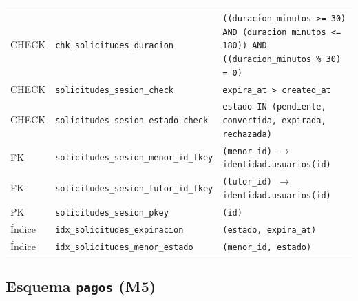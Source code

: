 {\small
\begin{xltabular}{\textwidth}{@{}>{\raggedright\arraybackslash}p{1.7cm} >{\raggedright\arraybackslash}p{4.6cm} L@{}}
    \toprule
     &  &  \\
    \midrule
    \endfirsthead
    \toprule
     &  &  \\
    \midrule
    \endhead
    \bottomrule
    \endfoot
    CHECK & \texttt{chk\_\allowbreak{}solicitudes\_\allowbreak{}duracion} & \texttt{(\allowbreak{}(\allowbreak{}duracion\_\allowbreak{}minutos \textgreater{}= 30) AND (\allowbreak{}duracion\_\allowbreak{}minutos \textless{}= 180)) AND (\allowbreak{}(\allowbreak{}duracion\_\allowbreak{}minutos \% 30) = 0)} \\
    CHECK & \texttt{solicitudes\_\allowbreak{}sesion\_\allowbreak{}check} & \texttt{expira\_\allowbreak{}at \textgreater{} created\_\allowbreak{}at} \\
    CHECK & \texttt{solicitudes\_\allowbreak{}sesion\_\allowbreak{}estado\_\allowbreak{}check} & \texttt{estado IN (\allowbreak{}\textquotesingle{}pendiente\textquotesingle{},\allowbreak{} \textquotesingle{}convertida\textquotesingle{},\allowbreak{} \textquotesingle{}expirada\textquotesingle{},\allowbreak{} \textquotesingle{}rechazada\textquotesingle{})} \\
    FK & \texttt{solicitudes\_\allowbreak{}sesion\_\allowbreak{}menor\_\allowbreak{}id\_\allowbreak{}fkey} & \texttt{(\allowbreak{}menor\_\allowbreak{}id) $\rightarrow$ identidad.usuarios(\allowbreak{}id)} \\
    FK & \texttt{solicitudes\_\allowbreak{}sesion\_\allowbreak{}tutor\_\allowbreak{}id\_\allowbreak{}fkey} & \texttt{(\allowbreak{}tutor\_\allowbreak{}id) $\rightarrow$ identidad.usuarios(\allowbreak{}id)} \\
    PK & \texttt{solicitudes\_\allowbreak{}sesion\_\allowbreak{}pkey} & \texttt{(\allowbreak{}id)} \\
    Índice & \texttt{idx\_\allowbreak{}solicitudes\_\allowbreak{}expiracion} & \texttt{(\allowbreak{}estado,\allowbreak{} expira\_\allowbreak{}at)} \\
    Índice & \texttt{idx\_\allowbreak{}solicitudes\_\allowbreak{}menor\_\allowbreak{}estado} & \texttt{(\allowbreak{}menor\_\allowbreak{}id,\allowbreak{} estado)} \\
\end{xltabular}
}

\subsection{Esquema \texttt{pagos} (M5)}\label{dd:pagos}

